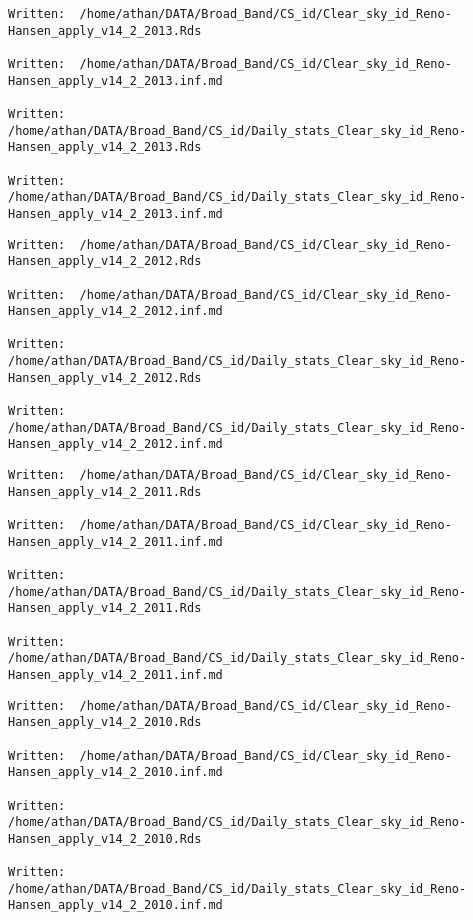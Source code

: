 \documentclass[
  10pt,
  a4paper,oneside]{article}
\begin{document}
\begin{verbatim}
Written:  /home/athan/DATA/Broad_Band/CS_id/Clear_sky_id_Reno-Hansen_apply_v14_2_2013.Rds 

Written:  /home/athan/DATA/Broad_Band/CS_id/Clear_sky_id_Reno-Hansen_apply_v14_2_2013.inf.md 

Written:  /home/athan/DATA/Broad_Band/CS_id/Daily_stats_Clear_sky_id_Reno-Hansen_apply_v14_2_2013.Rds 

Written:  /home/athan/DATA/Broad_Band/CS_id/Daily_stats_Clear_sky_id_Reno-Hansen_apply_v14_2_2013.inf.md 
\end{verbatim}

\begin{verbatim}
Written:  /home/athan/DATA/Broad_Band/CS_id/Clear_sky_id_Reno-Hansen_apply_v14_2_2012.Rds 

Written:  /home/athan/DATA/Broad_Band/CS_id/Clear_sky_id_Reno-Hansen_apply_v14_2_2012.inf.md 

Written:  /home/athan/DATA/Broad_Band/CS_id/Daily_stats_Clear_sky_id_Reno-Hansen_apply_v14_2_2012.Rds 

Written:  /home/athan/DATA/Broad_Band/CS_id/Daily_stats_Clear_sky_id_Reno-Hansen_apply_v14_2_2012.inf.md 
\end{verbatim}

\begin{verbatim}
Written:  /home/athan/DATA/Broad_Band/CS_id/Clear_sky_id_Reno-Hansen_apply_v14_2_2011.Rds 

Written:  /home/athan/DATA/Broad_Band/CS_id/Clear_sky_id_Reno-Hansen_apply_v14_2_2011.inf.md 

Written:  /home/athan/DATA/Broad_Band/CS_id/Daily_stats_Clear_sky_id_Reno-Hansen_apply_v14_2_2011.Rds 

Written:  /home/athan/DATA/Broad_Band/CS_id/Daily_stats_Clear_sky_id_Reno-Hansen_apply_v14_2_2011.inf.md 
\end{verbatim}

\begin{verbatim}
Written:  /home/athan/DATA/Broad_Band/CS_id/Clear_sky_id_Reno-Hansen_apply_v14_2_2010.Rds 

Written:  /home/athan/DATA/Broad_Band/CS_id/Clear_sky_id_Reno-Hansen_apply_v14_2_2010.inf.md 

Written:  /home/athan/DATA/Broad_Band/CS_id/Daily_stats_Clear_sky_id_Reno-Hansen_apply_v14_2_2010.Rds 

Written:  /home/athan/DATA/Broad_Band/CS_id/Daily_stats_Clear_sky_id_Reno-Hansen_apply_v14_2_2010.inf.md 
\end{verbatim}
\end{document}

